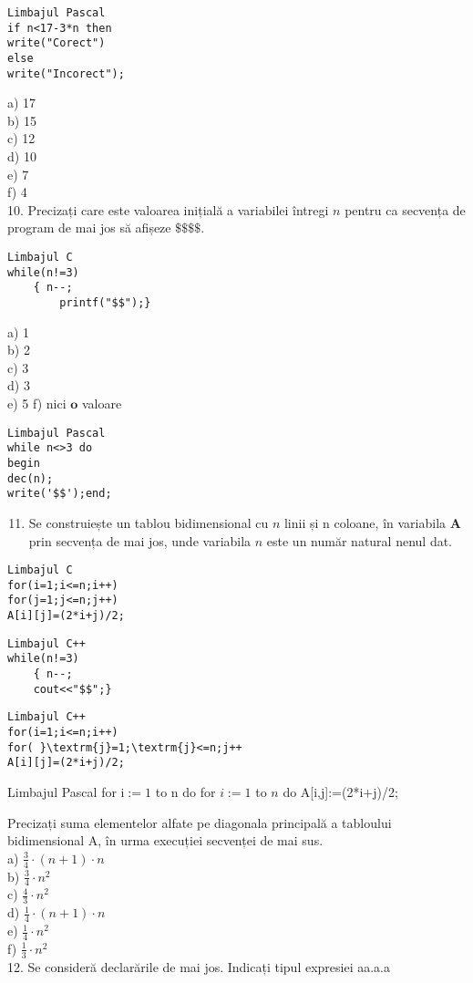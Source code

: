 \begin{verbatim}
Limbajul Pascal
if n<17-3*n then
write("Corect")
else
write("Incorect");
\end{verbatim}

a) 17\\
b) 15\\
c) 12\\
d) 10\\
e) 7\\
f) 4\\
10. Precizați care este valoarea inițială a variabilei întregi $n$ pentru ca secvența de program de mai jos să afișeze $\mathbf{\$} \mathbf{\$} \mathbf{\$} \mathbf{\$}$.

\begin{verbatim}
Limbajul C
while(n!=3)
    { n--;
        printf("$$");}
\end{verbatim}

a) 1\\
b) 2\\
c) 3\\
d) 3\\
e) 5 f) nici $\mathbf{o}$ valoare

\begin{verbatim}
Limbajul Pascal
while n<>3 do
begin
dec(n);
write('$$');end;
\end{verbatim}

\begin{enumerate}
  \setcounter{enumi}{10}
  \item Se construiește un tablou bidimensional cu $n$ linii și n coloane, în variabila $\mathbf{A}$ prin secvența de mai jos, unde variabila $n$ este un număr natural nenul dat.
\end{enumerate}

\begin{verbatim}
Limbajul C
for(i=1;i<=n;i++)
for(j=1;j<=n;j++)
A[i][j]=(2*i+j)/2;
\end{verbatim}

\begin{verbatim}
Limbajul C++
while(n!=3)
    { n--;
    cout<<"$$";}
\end{verbatim}

\begin{verbatim}
Limbajul C++
for(i=1;i<=n;i++)
for( }\textrm{j}=1;\textrm{j}<=n;j++
A[i][j]=(2*i+j)/2;
\end{verbatim}

Limbajul Pascal for $\mathrm{i}:=1$ to n do for $i:=1$ to $n$ do A[i,j]:=(2*i+j)/2;

Precizați suma elementelor alfate pe diagonala principală a tabloului bidimensional A, în urma execuției secvenței de mai sus.\\
a) $\frac{3}{4} \cdot(n+1) \cdot n$\\
b) $\frac{3}{4} \cdot n^{2}$\\
c) $\frac{4}{3} \cdot n^{2}$\\
d) $\frac{1}{4} \cdot(n+1) \cdot n$\\
e) $\frac{1}{4} \cdot n^{2}$\\
f) $\frac{1}{3} \cdot n^{2}$\\
12. Se consideră declarările de mai jos. Indicați tipul expresiei aa.a.a

